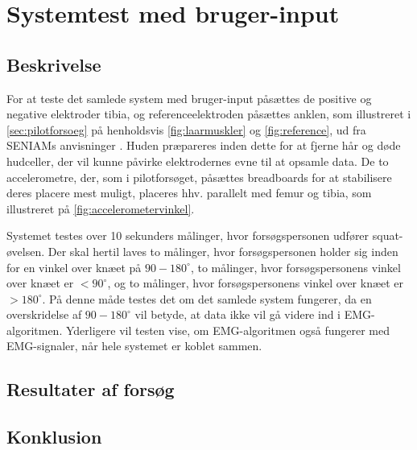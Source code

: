 \section{Systemtest med bruger-input}

\subsection{Beskrivelse}
For at teste det samlede system med bruger-input påsættes de positive og negative elektroder tibia, og referenceelektroden påsættes anklen, som illustreret i \autoref{sec:pilotforsoeg} på henholdsvis \autoref{fig:laarmuskler} og \autoref{fig:reference}, ud fra SENIAMs anvisninger \citep{seniam2016}. Huden præpareres inden dette for at fjerne hår og døde hudceller, der vil kunne påvirke elektrodernes evne til at opsamle data. 
De to accelerometre, der, som i pilotforsøget, påsættes breadboards for at stabilisere deres placere mest muligt, placeres hhv. parallelt med femur og tibia, som illustreret på \autoref{fig:accelerometervinkel}.

Systemet testes over 10 sekunders målinger, hvor forsøgspersonen udfører squat-øvelsen. Der skal hertil laves to målinger, hvor forsøgspersonen holder sig inden for en vinkel over knæet på $90-180^{\circ}$, to målinger, hvor forsøgspersonens vinkel over knæet er $<90^{\circ}$, og to målinger, hvor forsøgspersonens vinkel over knæet er $>180^{\circ}$. På denne måde testes det om det samlede system fungerer, da en overskridelse af $90-180^{\circ}$ vil betyde, at data ikke vil gå videre ind i EMG-algoritmen. Yderligere vil testen vise, om EMG-algoritmen også fungerer med EMG-signaler, når hele systemet er koblet sammen. 

\subsection{Resultater af forsøg}


\subsection{Konklusion}
